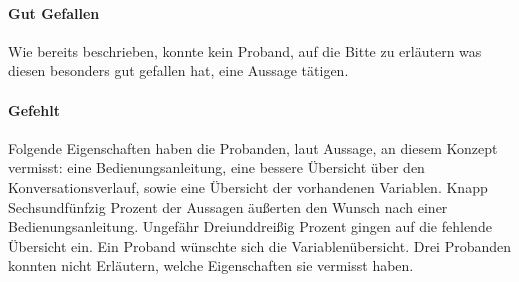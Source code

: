 \paragraph{Gut Gefallen}Wie bereits beschrieben, konnte kein Proband, auf die Bitte zu erläutern was diesen besonders gut gefallen hat, eine Aussage tätigen.

\paragraph{Gefehlt}Folgende Eigenschaften haben die Probanden, laut Aussage, an diesem Konzept vermisst: eine Bedienungsanleitung, eine bessere Übersicht über den Konversationsverlauf, sowie eine Übersicht der vorhandenen Variablen. Knapp Sechsundfünfzig Prozent der Aussagen äußerten den Wunsch nach einer Bedienungsanleitung. Ungefähr Dreiunddreißig Prozent gingen auf die fehlende Übersicht ein. Ein Proband wünschte sich die Variablenübersicht. Drei Probanden konnten nicht Erläutern, welche Eigenschaften sie vermisst haben.


